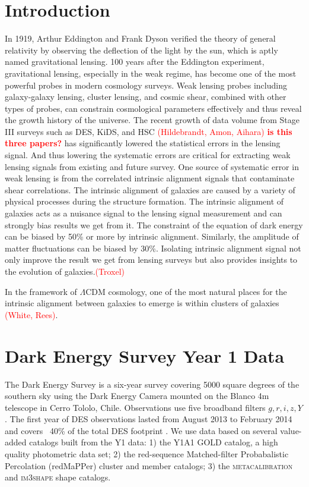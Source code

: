 \documentclass[fleqn,usenatbib]{mnras}
\newcommand{\verify}[1]{\textcolor{red}{\textbf{{#1}}}}
\newcommand\ct[1]{\textcolor{red}{(#1)}}
\begin{document}
\section{Introduction}
In 1919, Arthur Eddington and Frank Dyson verified the theory of general relativity by observing the deflection of the light by the sun, which is aptly named gravitational lensing. 100 years after the Eddington experiment, gravitational lensing, especially in the weak regime, has become one of the most powerful probes in modern cosmology surveys. Weak lensing probes including galaxy-galaxy lensing, cluster lensing, and cosmic shear, combined with other types of probes, can constrain cosmological parameters effectively and thus reveal the growth history of the universe. The recent growth of data volume from Stage III surveys such as DES, KiDS, and HSC \ct{Hildebrandt, Amon, Aihara} \verify{is this three papers?} has significantly lowered the statistical errors in the lensing signal. And thus lowering the systematic errors are critical for extracting weak lensing signals from existing and future survey. One source of systematic error in weak lensing is from the correlated intrinsic alignment signals that contaminate shear correlations. The intrinsic alignment of galaxies are caused by a variety of physical processes during the structure formation. The intrinsic alignment of galaxies acts as a nuisance signal to the lensing signal measurement and can strongly bias results we get from it. The constraint of the equation of dark energy can be biased by 50\% or more by intrinsic alignment. Similarly, the amplitude of matter fluctuations can be biased by 30\%. Isolating intrinsic alignment signal not only improve the result we get from lensing surveys but also provides insights to the evolution of galaxies.\ct{Troxel}

In the framework of $\Lambda$CDM cosmology, one of the most natural places for the intrinsic alignment between galaxies to emerge is within clusters of galaxies \ct{White, Rees}. 




\section{Dark Energy Survey Year 1 Data}
The Dark Energy Survey is a six-year survey covering 5000 square degrees of the southern sky using the Dark Energy Camera \cite{decam} mounted on the Blanco 4m telescope in Cerro Tololo, Chile. Observations use five broadband filters $g, r, i, z , Y$. The first year of DES observations lasted from August 2013 to February 2014 and covers ~40\% of the total DES footprint \cite{y1gold}. We use data based on several value-added catalogs built from the Y1 data: 1) the Y1A1 GOLD catalog, a high quality photometric data set; 2) the red-sequence Matched-filter Probabalistic Percolation (redMaPPer) cluster and member catalogs; 3) the \textsc{metacalibration} and \textsc{im3shape} shape catalogs. 
\end{document}
